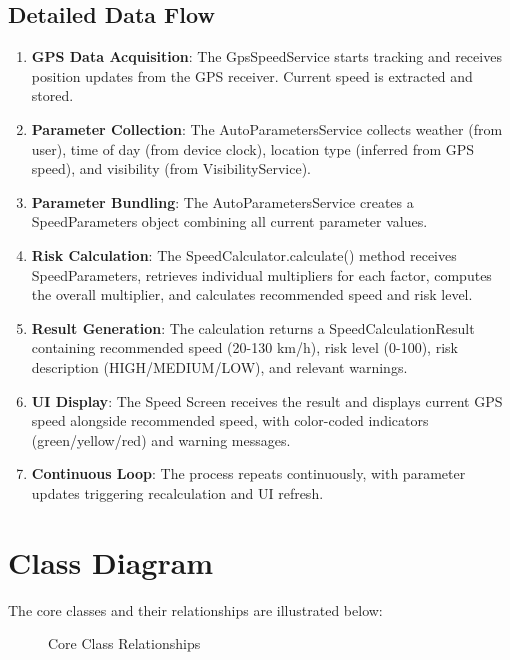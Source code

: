 \subsection{Detailed Data Flow}
\begin{enumerate}
    \item \textbf{GPS Data Acquisition}: The GpsSpeedService starts tracking and receives position updates from the GPS receiver. Current speed is extracted and stored.
    
    \item \textbf{Parameter Collection}: The AutoParametersService collects weather (from user), time of day (from device clock), location type (inferred from GPS speed), and visibility (from VisibilityService).
    
    \item \textbf{Parameter Bundling}: The AutoParametersService creates a SpeedParameters object combining all current parameter values.
    
    \item \textbf{Risk Calculation}: The SpeedCalculator.calculate() method receives SpeedParameters, retrieves individual multipliers for each factor, computes the overall multiplier, and calculates recommended speed and risk level.
    
    \item \textbf{Result Generation}: The calculation returns a SpeedCalculationResult containing recommended speed (20-130 km/h), risk level (0-100), risk description (HIGH/MEDIUM/LOW), and relevant warnings.
    
    \item \textbf{UI Display}: The Speed Screen receives the result and displays current GPS speed alongside recommended speed, with color-coded indicators (green/yellow/red) and warning messages.
    
    \item \textbf{Continuous Loop}: The process repeats continuously, with parameter updates triggering recalculation and UI refresh.
\end{enumerate}

\section{Class Diagram}
The core classes and their relationships are illustrated below:

\begin{figure}[h]
\centering
{}
\caption{Core Class Relationships}
\label{fig:classdiag}
\end{figure}

